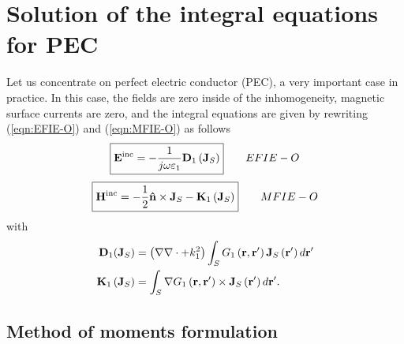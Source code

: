 \chapter{Solution of the integral equations for PEC}
%
\par
Let us concentrate on perfect electric conductor (PEC), a very important case in practice. In this case, the fields are zero inside of the inhomogeneity, magnetic surface currents are zero, and the integral equations are given by rewriting (\ref{eqn:EFIE-O}) and (\ref{eqn:MFIE-O}) as follows
\begin{equation}\label{eqn:EFIE-O_PEC}
\boxed{
\mathbf{E}^\text{inc} =  - \frac{1}{j \omega \varepsilon_1} \mathbf{D}_1 \left( \mathbf{J}_{S}\right) 
} \qquad EFIE-O
\end{equation}
\begin{equation}\label{eqn:MFIE-O_PEC}
\boxed{
\mathbf{H}^\text{inc} = - \frac{1}{2} \mathbf{\hat{n}} \times \mathbf{J}_{S} - \mathbf{K}_1 \left(\mathbf{J}_{S}\right)
} \qquad MFIE-O
\end{equation}
with
\begin{align*}
\mathbf{D}_1\!\left(\mathbf{J}_S\right) &= \left(\nabla \nabla \cdot + k_1^2\right) \int_{S} G_1\left(\mathbf{r}, \mathbf{r}'\right) \mathbf{J}_S\left(\mathbf{r}'\right) d\mathbf{r}' \\
\mathbf{K}_1\left(\mathbf{J}_S\right) &= \int_S \nabla G_1\left(\mathbf{r}, \mathbf{r}'\right) \times \mathbf{J}_S\left(\mathbf{r}'\right) d\mathbf{r}'.
\end{align*}


\section{Method of moments formulation}

